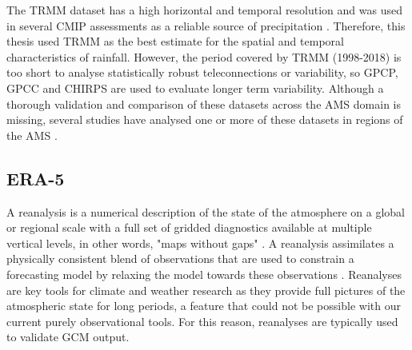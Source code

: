 
The TRMM dataset has a high horizontal and temporal resolution and was used in several CMIP assessments \citep{geil2013,jones2013} as a reliable source of precipitation \citep{carvalho2012}. Therefore, this thesis used TRMM as the best estimate for the spatial and temporal characteristics of rainfall. However,
 the period covered by TRMM (1998-2018) is too short to analyse statistically robust teleconnections or variability, so GPCP, GPCC and CHIRPS are used to evaluate longer term variability.
 Although a thorough validation and comparison of these datasets across the AMS domain is missing, several studies have analysed  one or more of these datasets in regions of the AMS \citep[e.g.][]{franchito2009,dinku2010,trejo2016}.


\subsection{ERA-5}


A reanalysis is a numerical description of the state of the atmosphere on a global or regional scale with a full set of gridded diagnostics available at multiple vertical levels, in other words, "maps without gaps" \citep{era5hersbach}. A reanalysis assimilates a physically consistent blend of observations that are used to constrain a forecasting model by relaxing the model towards these observations \citep[e.g.][]{fujiwara2021}.
Reanalyses are key tools for climate and weather research as they provide full pictures of the atmospheric state for long periods, a feature that could not be possible with our current purely observational tools. For this reason, reanalyses are typically used to validate GCM output. 

